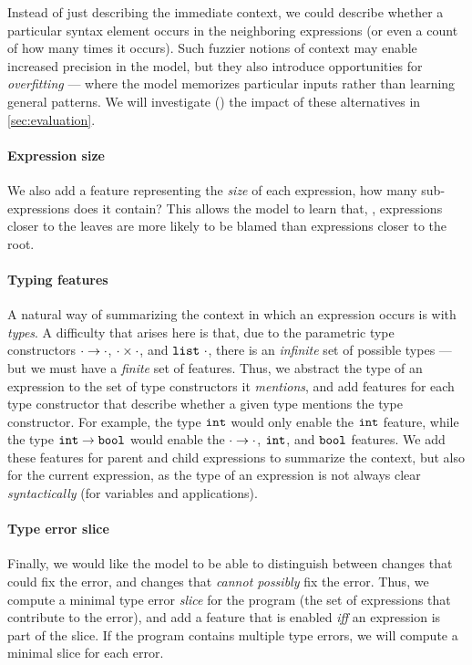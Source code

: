 Instead of just describing the immediate context, we could describe
whether a particular syntax element occurs in the neighboring
expressions (or even a count of how many times it occurs).
%
Such fuzzier notions of context may enable increased precision in the
model, but they also introduce opportunities for \emph{overfitting} ---
where the model memorizes particular inputs rather than learning general
patterns.
%
We will investigate () the impact of these alternatives
in \autoref{sec:evaluation}.

\paragraph{Expression size}
We also add a feature representing the \emph{size} of each expression,
\ie how many sub-expressions does it contain?
%
This allows the model to learn that, \eg, expressions closer to the
leaves are more likely to be blamed than expressions closer to the root.

\paragraph{Typing features}
A natural way of summarizing the context in which an expression occurs
is with \emph{types}.
%
A difficulty that arises here is that, due to the parametric type
constructors $\cdot \to \cdot$, $\cdot \times \cdot$, and
$\mathtt{list}\ \cdot$, there is an \emph{infinite} set of possible types ---
but we must have a \emph{finite} set of features.
%
Thus, we abstract the type of an expression to the set of type
constructors it \emph{mentions}, and add features for each type
constructor that describe whether a given type mentions the type
constructor.
%
For example, the type $\mathtt{int}$ would only enable the $\mathtt{int}$ feature,
while the type $\mathtt{int} \to \mathtt{bool}$ would enable the
$\cdot \to \cdot$, $\mathtt{int}$, and $\mathtt{bool}$ features.
%
We add these features for parent and child expressions to summarize the
context, but also for the current expression, as the type of an
expression is not always clear \emph{syntactically} (\eg for variables
and applications).
%

\paragraph{Type error slice}
Finally, we would like the model to be able to distinguish between
changes that could fix the error, and changes that
\emph{cannot possibly} fix the error.
%
Thus, we compute a minimal type error \emph{slice} for the program
(\ie the set of expressions that contribute to the error), and add a
feature that is enabled \emph{iff} an expression is part of the slice.
%
If the program contains multiple type errors, we will compute a minimal
slice for each error.

